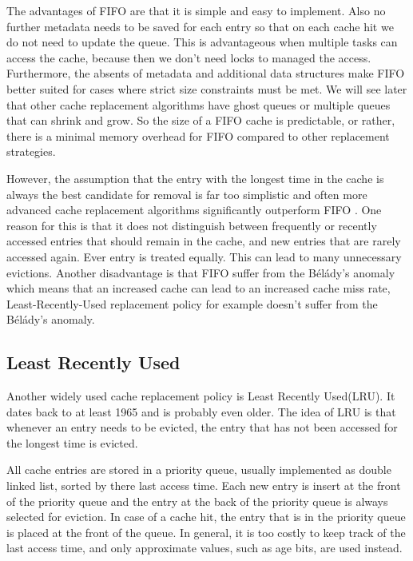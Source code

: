 \documentclass[
	12pt,
	a4paper,
	abstract,
	bibliography=totoc,
	chapterprefix,
	headings=openright,
	numbers=endperiod,
	parskip=half,
	twoside,
]{scrreprt}
\begin{document}
The advantages of FIFO are that it is simple and easy to implement.
Also no further metadata needs to be saved for each entry so that on each cache hit we do not need to update the queue.
This is advantageous when multiple tasks can access the cache, because then 
we don't need locks to managed the access.
Furthermore, the absents of metadata and additional data structures make FIFO better suited for cases where strict size constraints must be met. 
We will see later that other cache replacement algorithms have ghost queues or multiple queues that can shrink and grow. So the size 
of a FIFO cache is predictable, or rather, there is a minimal memory overhead for FIFO compared to other replacement strategies.

However, the assumption that the entry with the longest time in the cache is always the best candidate for removal is far too 
simplistic and often more advanced cache replacement algorithms significantly outperform FIFO \cite{van1992lru}.
One reason for this is that it does not distinguish between frequently or recently accessed entries that should remain in the cache, and new entries that are rarely accessed again. Ever entry is treated equally. This can lead to many unnecessary evictions.
Another disadvantage is that FIFO suffer from the Bélády's anomaly \cite{10.1145/363011.363155} which means that an increased cache can lead to an increased cache miss rate, Least-Recently-Used replacement policy for example doesn't suffer from the Bélády's anomaly.

\subsection{Least Recently Used}
Another widely used cache replacement policy is Least Recently Used(LRU).
It dates back to at least 1965 \cite{denning1980working} and is probably even older.
The idea of LRU is that whenever an entry needs to be evicted, the entry that has not been accessed for the longest time is evicted.

All cache entries are stored in a priority queue, usually implemented as double linked list, sorted by there last access time.
Each new entry is insert at the front of the priority queue and the entry at the back of the priority queue is always selected for eviction.
In case of a cache hit, the entry that is in the priority queue is placed at the front of the queue.
In general, it is too costly to keep track of the last access time, and only approximate values, such as age bits, are used instead.
\end{document}
